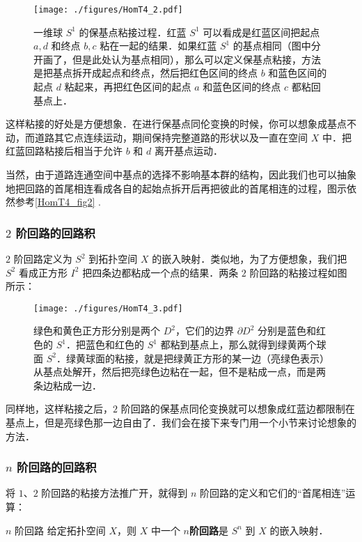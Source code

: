 \begin{figure}[ht]
\centering
\texttt{[image: ./figures/HomT4\_2.pdf]}
\caption{一维球 $S^1$ 的保基点粘接过程．红蓝 $S^1$ 可以看成是红蓝区间把起点 $a, d$ 和终点 $b, c$ 粘在一起的结果．如果红蓝 $S^1$ 的基点相同（图中分开画了，但是此处认为基点相同），那么可以定义保基点粘接，方法是把基点拆开成起点和终点，然后把红色区间的终点 $b$ 和蓝色区间的起点 $d$ 粘起来，再把红色区间的起点 $a$ 和蓝色区间的终点 $c$ 都粘回基点上．} \label{HomT4_fig2}
\end{figure}

这样粘接的好处是方便想象．在进行保基点同伦变换的时候，你可以想象成基点不动，而道路其它点连续运动，期间保持完整道路的形状以及一直在空间 $X$ 中．把红蓝回路粘接后相当于允许 $b$ 和 $d$ 离开基点运动．

当然，由于道路连通空间中基点的选择不影响基本群的结构，因此我们也可以抽象地把回路的首尾相连看成各自的起始点拆开后再把彼此的首尾相连的过程，图示依然参考\autoref{HomT4_fig2} .

\subsubsection{$2$ 阶回路的回路积}

$2$ 阶回路定义为 $S^2$ 到拓扑空间 $X$ 的嵌入映射．类似地，为了方便想象，我们把 $S^2$ 看成正方形 $I^2$ 把四条边都粘成一个点的结果．两条 $2$ 阶回路的粘接过程如图所示：

\begin{figure}[ht]
\centering
\texttt{[image: ./figures/HomT4\_3.pdf]}
\caption{绿色和黄色正方形分别是两个 $D^2$，它们的边界 $\partial D^2$ 分别是蓝色和红色的 $S^1$．把蓝色和红色的 $S^1$ 都粘到基点上，那么就得到绿黄两个球面 $S^2$．绿黄球面的粘接，就是把绿黄正方形的某一边（亮绿色表示）从基点处解开，然后把亮绿色边粘在一起，但不是粘成一点，而是两条边粘成一边．} \label{HomT4_fig3}
\end{figure}

同样地，这样粘接之后，$2$ 阶回路的保基点同伦变换就可以想象成红蓝边都限制在基点上，但是亮绿色那一边自由了．我们会在接下来专门用一个小节来讨论想象的方法．%

\subsubsection{$n$ 阶回路的回路积}

将 $1$、$2$ 阶回路的粘接方法推广开，就得到 $n$ 阶回路的定义和它们的“首尾相连”运算：

\begin{definition}{$n$ 阶回路}
给定拓扑空间 $X$，则 $X$ 中一个 $n$\textbf{阶回路}是 $S^n$ 到 $X$ 的嵌入映射．
\end{definition}

